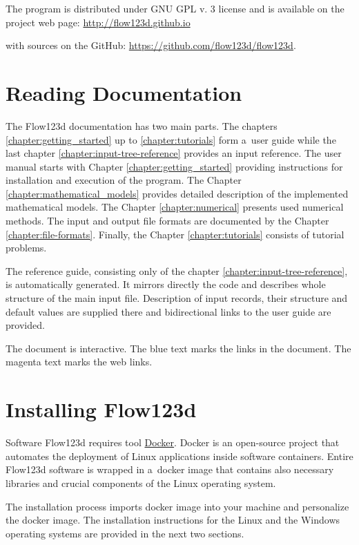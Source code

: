 \documentclass[12pt,a4paper]{report}
\begin{document}
The program is distributed under GNU GPL v. 3 license and is available on the project web page:
\url{http://flow123d.github.io}

with sources on the GitHub:
\url{https://github.com/flow123d/flow123d}.


\section{Reading Documentation}
The Flow123d documentation has two main parts. The chapters \ref{chapter:getting_started} up to \ref{chapter:tutorials} 
form a~user guide while the last chapter \ref{chapter:input-tree-reference} provides an input reference.
The user manual starts with Chapter \ref{chapter:getting_started} providing instructions for installation and execution of the program.
The Chapter \ref{chapter:mathematical_models} provides detailed description of the implemented mathematical models.
The Chapter \ref{chapter:numerical} presents used numerical methods. The input and output file formats are documented by the Chapter 
\ref{chapter:file-formats}. Finally, the Chapter \ref{chapter:tutorials}  consists of tutorial problems.

The reference guide, consisting only of the chapter \ref{chapter:input-tree-reference}, is automatically
generated. It mirrors directly the code and describes whole structure of the main input file. Description
of input records, their structure and default values are supplied there and bidirectional links to the user 
guide are provided.

The document is interactive. The blue text marks the links in the document. The magenta text marks the web links.

\section{Installing Flow123d}
Software Flow123d requires tool \href{https://www.docker.com}{Docker}. 
Docker is an open-source project that automates the deployment of Linux applications inside software containers. 
Entire Flow123d software is wrapped in a~docker image that contains also necessary libraries and crucial components 
of the Linux operating system.

The installation process imports docker image into your machine and personalize the docker image. The installation 
instructions for the Linux and the Windows operating systems are provided in the next two sections.
\end{document}
